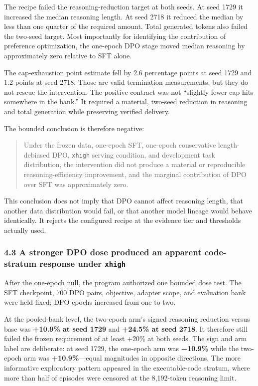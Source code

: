 \documentclass[
  9pt,
  letterpaper,
]{article}
\begin{document}
The recipe failed the reasoning-reduction target at both seeds. At seed
1729 it increased the median reasoning length. At seed 2718 it reduced
the median by less than one quarter of the required amount. Total
generated tokens also failed the two-seed target. Most importantly for
identifying the contribution of preference optimization, the one-epoch
DPO stage moved median reasoning by approximately zero relative to SFT
alone.

The cap-exhaustion point estimate fell by 2.6 percentage points at seed
1729 and 1.2 points at seed 2718. Those are valid termination
measurements, but they do not rescue the intervention. The positive
contract was not ``slightly fewer cap hits somewhere in the bank.'' It
required a material, two-seed reduction in reasoning and total
generation while preserving verified delivery.

The bounded conclusion is therefore negative:

\begin{quote}
Under the frozen data, one-epoch SFT, one-epoch conservative
length-debiased DPO, \texttt{xhigh} serving condition, and development
task distribution, the intervention did not produce a material or
reproducible reasoning-efficiency improvement, and the marginal
contribution of DPO over SFT was approximately zero.
\end{quote}

This conclusion does not imply that DPO cannot affect reasoning length,
that another data distribution would fail, or that another model lineage
would behave identically. It rejects the configured recipe at the
evidence tier and thresholds actually used.

\hypertarget{43-a-stronger-dpo-dose-produced-an-apparent-code-stratum-response-under-xhigh}{%
\subsubsection{\texorpdfstring{4.3 A stronger DPO dose produced an
apparent code-stratum response under
\texttt{xhigh}}{4.3 A stronger DPO dose produced an apparent code-stratum response under xhigh}}\label{43-a-stronger-dpo-dose-produced-an-apparent-code-stratum-response-under-xhigh}}

After the one-epoch null, the program authorized one bounded dose test.
The SFT checkpoint, 700 DPO pairs, objective, adapter scope, and
evaluation bank were held fixed; DPO epochs increased from one to two.

At the pooled-bank level, the two-epoch arm's signed reasoning reduction
versus base was \textbf{+10.9\% at seed 1729} and \textbf{+24.5\% at
seed 2718}. It therefore still failed the frozen requirement of at least
+20\% at both seeds. The sign and arm label are deliberate: at seed
1729, the one-epoch arm was \textbf{−10.9\%} while the two-epoch arm was
\textbf{+10.9\%}---equal magnitudes in opposite directions. The more
informative exploratory pattern appeared in the executable-code stratum,
where more than half of episodes were censored at the 8,192-token
reasoning limit.
\end{document}
